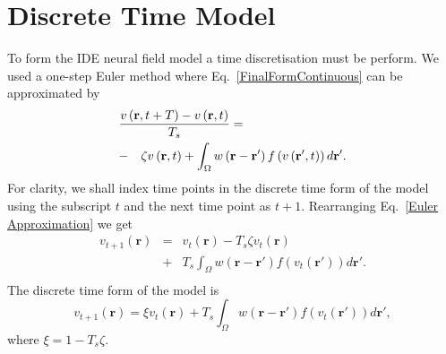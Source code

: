 \documentclass[10pt,a4paper]{article}
\begin{document}
\section{Discrete Time Model}\label{Time Discretization} To form the IDE neural field model a time discretisation must be perform. We used a one-step Euler method where Eq.~\ref{FinalFormContinuous} can be approximated by 
\begin{eqnarray}
	\label{Euler Approximation} \lefteqn{\frac{v\left( \mathbf{r},t+T \right) - v\left( \mathbf{r},t\right)}{T_s} =}\nonumber\\
& -&\zeta v\left( \mathbf{r},t \right) + \int_\Omega {w\left( \mathbf{r}-\mathbf{r}' \right)f\left( {v\left( \mathbf{r}',t \right)} \right)d\mathbf{r}'}.\nonumber \\ 
\end{eqnarray}
For clarity, we shall index time points in the discrete time form of the model using the subscript $t$ and the next time point as $t+1$. Rearranging Eq.~\ref{Euler Approximation} we get 
\begin{eqnarray}
	\label{Euler Approximation2} v_{t+1}\left( \mathbf{r}\right) &=& v_t\left( \mathbf{r}\right) -T_s \zeta v_t\left( \mathbf{r}\right)\nonumber \\
&+& T_s \int_\Omega {w\left( \mathbf{r}-\mathbf{r}' \right)f\left( {v_t\left( \mathbf{r}'\right)} \right)d\mathbf{r}'}.\nonumber \\ 
\end{eqnarray}
The discrete time form of the model is 
\begin{equation}
	\label{Discrete Time Model1} v_{t+1}\left(\mathbf{r}\right) = \xi v_t\left(\mathbf{r}\right) + T_s \int_\Omega { w\left(\mathbf{r}-\mathbf{r}'\right) f\left(v_t\left(\mathbf{r}'\right)\right) d\mathbf{r}'}, 
\end{equation}
where $\xi = 1 - T_s \zeta$. 
\end{document}
